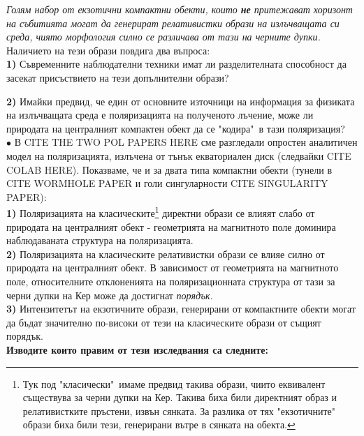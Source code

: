 \emph{Голям набор от екзотични компактни обекти, които \textbf{не} притежават хоризонт на събитията могат да генерират релативистки образи на излъчващата си среда, чиято морфология силно се различава от тази на черните дупки.}\\

\noindent Наличието на тези образи повдига два въпроса:\\

\noindent\textbf{1)} Съвременните наблюдателни техники имат ли разделителната способност да засекат присъствието на тези допълнителни образи?\newline

\noindent\textbf{2)} Имайки предвид, че един от основните източници на информация за физиката на излъчващата среда е поляризацията на полученото лъчение, може ли природата на централният компактен обект да се "кодира"$\,$ в тази поляризация?\\\newline
$\bullet$ В CITE THE TWO POL PAPERS HERE сме разгледали опростен аналитичен модел на поляризацията, излъчена от тънък екваториален диск (следвайки CITE COLAB HERE). Показваме, че и за двата типа компактни обекти (тунели в CITE WORMHOLE PAPER и голи сингуларности CITE SINGULARITY PAPER):\\\newline
\textbf{1)} Поляризацията на класическите\footnote{Тук под "класически"$\,$ имаме предвид такива образи, чиито еквивалент съществува за черни дупки на Кер. Такива биха били директният образ и релативистките пръстени, извън сянката. За разлика от тях "екзотичните"$\,$ образи биха били тези, генерирани вътре в сянката на обекта.} директни образи се влияят слабо от природата на централният обект - геометрията на магнитното поле доминира наблюдаваната структура на поляризацията.\\\newline
\textbf{2)} Поляризацията на класическите релативистки образи се влияе силно от природата на централният обект. В зависимост от геометрията на магнитното поле, относителните отклоненията на поляризационната структура от тази за черни дупки на Кер може да достигнат 
\emph{порядък.}\\\newline
\textbf{3)} Интензитетът на екзотичните образи, генерирани от компактните обекти могат да бъдат значително по-високи от тези на класическите образи от същият порядък.\\\newline
\textbf{Изводите които правим от тези изследвания са следните:}\\
